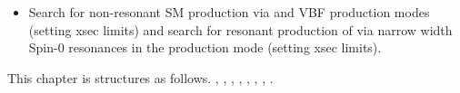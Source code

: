 \begin{itemize}

\item Search for non-resonant SM \HH production via \ggF and VBF
  production modes (setting xsec limits) and search for resonant
  production of \HH via narrow width Spin-0 resonances in the \ggF
  production mode (setting xsec limits).
\end{itemize}

This chapter is structures as follows. ,
, ,
, ,
, ,
.

